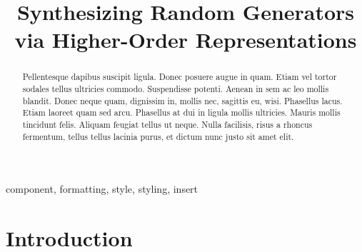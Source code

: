 \documentclass[conference, fleqn]{IEEEtran}
\begin{document}
\title{Synthesizing Random Generators via Higher-Order Representations}

\author{
\and
{}
}

\maketitle


\begin{abstract}

  Pellentesque dapibus suscipit ligula. Donec posuere augue in quam. Etiam vel
  tortor sodales tellus ultricies commodo. Suspendisse potenti. Aenean in sem ac
  leo mollis blandit. Donec neque quam, dignissim in, mollis nec, sagittis eu,
  wisi. Phasellus lacus. Etiam laoreet quam sed arcu. Phasellus at dui in ligula
  mollis ultricies. Mauris mollis tincidunt felis. Aliquam feugiat tellus ut
  neque. Nulla facilisis, risus a rhoncus fermentum, tellus tellus lacinia
  purus, et dictum nunc justo sit amet elit.

\end{abstract}

\begin{IEEEkeywords}
component, formatting, style, styling, insert
\end{IEEEkeywords}


\section{Introduction}
\end{document}
